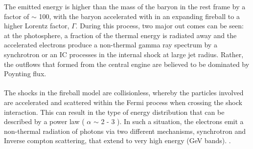 The  emitted  energy  is  higher than  the  mass of  the baryon in the rest frame by a factor of  $\sim $ 100, with  the  baryon  accelerated  with in an expanding fireball to a higher Lorentz factor, $\Gamma $. During this process, two major out comes can be seen: at the photosphere, a fraction of the thermal energy is radiated away  and  the  accelerated  electrons  produce  a non-thermal  gamma ray spectrum by a synchrotron  or an IC  processes in the  internal shock at large jet radius. Rather, the outflows that formed  from the central engine are believed to be dominated by Poynting flux.\citep{ 15}\citep{16}\\\\
The shocks in the fireball model are collisionless, whereby the particles involved are accelerated and scattered within the Fermi process when crossing the shock interaction. This can result in the type of energy distribution that can be described by a power law ( $ \alpha $  $ \sim $ 2 - 3 ). In such a situation, the electrons emit a non-thermal radiation of photons via two different mechanisms, synchrotron and Inverse compton scattering, that extend to very high energy (GeV bands).\citep{16} \citep {17}. 
